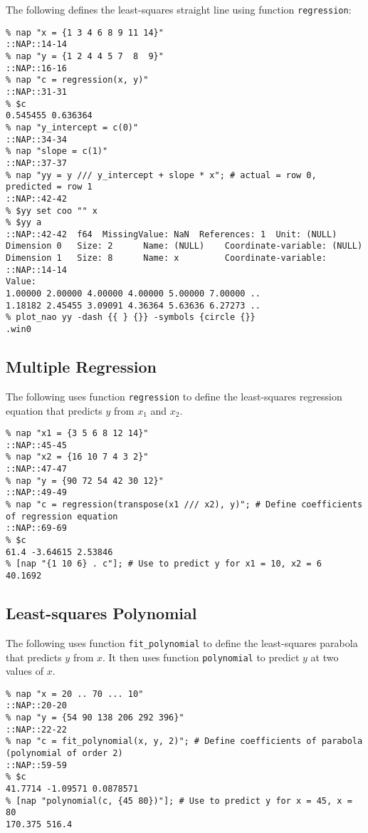 The following defines the least-squares
  straight line using function 
  \texttt{regression}:
  \begin{verbatim}
% nap "x = {1 3 4 6 8 9 11 14}"
::NAP::14-14
% nap "y = {1 2 4 4 5 7  8  9}"
::NAP::16-16
% nap "c = regression(x, y)"
::NAP::31-31
% $c
0.545455 0.636364
% nap "y_intercept = c(0)"
::NAP::34-34
% nap "slope = c(1)"
::NAP::37-37
% nap "yy = y /// y_intercept + slope * x"; # actual = row 0, predicted = row 1
::NAP::42-42
% $yy set coo "" x
% $yy a
::NAP::42-42  f64  MissingValue: NaN  References: 1  Unit: (NULL)
Dimension 0   Size: 2      Name: (NULL)    Coordinate-variable: (NULL)
Dimension 1   Size: 8      Name: x         Coordinate-variable: ::NAP::14-14
Value:
1.00000 2.00000 4.00000 4.00000 5.00000 7.00000 ..
1.18182 2.45455 3.09091 4.36364 5.63636 6.27273 ..
% plot_nao yy -dash {{ } {}} -symbols {circle {}}
.win0
\end{verbatim}

\subsection{Multiple Regression}

The following uses function 
  \texttt{regression} to define the least-squares regression
  equation that predicts 
  $y$ from $x_1$ and $x_2$.
  \begin{verbatim}
% nap "x1 = {3 5 6 8 12 14}"
::NAP::45-45
% nap "x2 = {16 10 7 4 3 2}"
::NAP::47-47
% nap "y = {90 72 54 42 30 12}"
::NAP::49-49
% nap "c = regression(transpose(x1 /// x2), y)"; # Define coefficients of regression equation
::NAP::69-69
% $c
61.4 -3.64615 2.53846
% [nap "{1 10 6} . c"]; # Use to predict y for x1 = 10, x2 = 6
40.1692
\end{verbatim}

\subsection{Least-squares Polynomial}

The following uses function 
  \texttt{fit\_polynomial} to define the least-squares parabola that
  predicts 
  $y$ from 
  $x$. It then uses function 
  \texttt{polynomial} to predict 
  $y$ at two values of 
  $x$.
  \begin{verbatim}
% nap "x = 20 .. 70 ... 10"
::NAP::20-20
% nap "y = {54 90 138 206 292 396}"
::NAP::22-22
% nap "c = fit_polynomial(x, y, 2)"; # Define coefficients of parabola (polynomial of order 2)
::NAP::59-59
% $c
41.7714 -1.09571 0.0878571
% [nap "polynomial(c, {45 80})"]; # Use to predict y for x = 45, x = 80
170.375 516.4
\end{verbatim}

